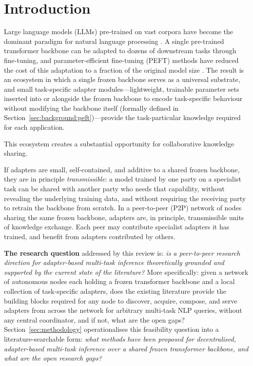 \section{Introduction}
\label{sec:introduction}

Large language models (LLMs) pre-trained on vast corpora have become the dominant
paradigm for natural language processing \cite{Vaswani2017, Devlin2019}. A single
pre-trained transformer backbone can be adapted to dozens of downstream tasks through
fine-tuning, and parameter-efficient fine-tuning (PEFT) methods have reduced the cost
of this adaptation to a fraction of the original model size \cite{Houlsby2019, Hu2022}.
The result is an ecosystem in which a single frozen backbone serves as a universal
substrate, and small task-specific adapter modules---lightweight,
trainable parameter sets inserted into or alongside the frozen backbone to
encode task-specific behaviour without modifying the backbone itself
(formally defined in Section~\ref{sec:background:peft})---provide the
task-particular knowledge required for each application.

This ecosystem creates a substantial opportunity for collaborative knowledge sharing.

If adapters are small, self-contained, and additive to a shared frozen backbone, they
are in principle \textit{transmissible}: a model trained by one party on a specialist
task can be shared with another party who needs that capability, without revealing
the underlying training data, and without requiring the receiving party to retrain the
backbone from scratch. In a peer-to-peer (P2P) network of nodes sharing the same
frozen backbone, adapters are, in principle, transmissible units of knowledge exchange. Each peer
may contribute specialist adapters it has trained, and benefit from adapters
contributed by others.

\textbf{The research question} addressed by this review is: \textit{is a
peer-to-peer research direction for adapter-based multi-task inference
theoretically grounded and supported by the current state of the literature?}
More specifically: given a network of autonomous nodes each holding a frozen
transformer backbone and a local collection of task-specific adapters, does the
existing literature provide the building blocks required for any node to
discover, acquire, compose, and serve adapters from across the network for
arbitrary multi-task NLP queries, without any central coordinator, and if
not, what are the open gaps?
Section~\ref{sec:methodology} operationalises this feasibility question into a literature-searchable form: \textit{what methods have been proposed 
for decentralised, adapter-based multi-task inference over a shared frozen 
transformer backbone, and what are the open research gaps?}

